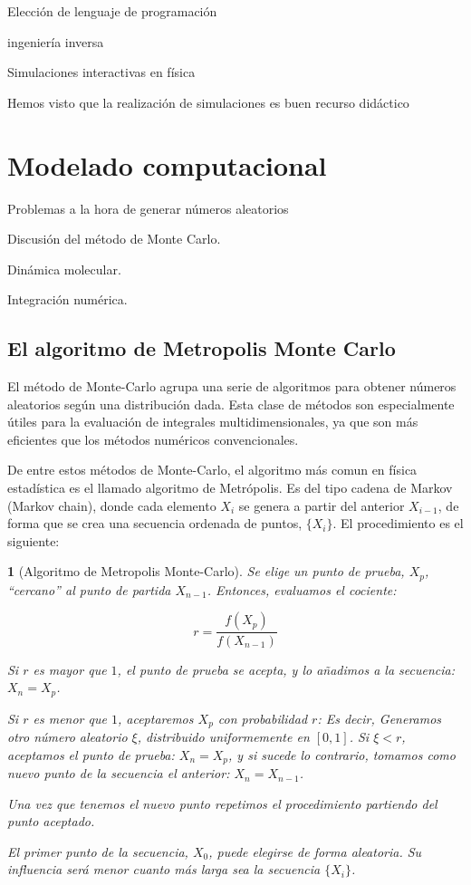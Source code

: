 \documentclass[11pt, a4paper]{article} %
\theoremstyle{named}
\newtheorem*{namedtheorem}{}
\begin{document}
Elección de lenguaje de programación

ingeniería inversa

Simulaciones interactivas en física

Hemos visto que la realización de simulaciones es buen recurso didáctico

\newpage
\appendix

\section{Modelado computacional}\label{sec:modComp}

Problemas a la hora de generar números aleatorios

Discusión del método de Monte Carlo.

Dinámica molecular.

Integración numérica.

\subsection{El algoritmo de Metropolis Monte Carlo}\label{sec:metropolis}

El método de Monte-Carlo agrupa una serie de algoritmos para obtener números aleatorios según una distribución dada. Esta clase de métodos son especialmente útiles para la evaluación de integrales multidimensionales, ya que son más eficientes que los métodos numéricos convencionales.

De entre estos métodos de Monte-Carlo, el algoritmo más comun en física estadística es el llamado algoritmo de Metrópolis. Es del tipo cadena de Markov (Markov chain), donde cada elemento $X_i$ se genera a partir del anterior $X_{i-1}$, de forma que se crea una secuencia ordenada de puntos, $\{X_i\}$. El procedimiento es el siguiente:

\begin{namedtheorem}[Algoritmo de Metropolis Monte-Carlo]
Se elige un punto de prueba, $X_{p}$, ``cercano'' al punto de partida $X_{n-1}$. Entonces, evaluamos el cociente:

\begin{equation}\label{eq:metropCoci}
r= \frac{f(X_p)}{f(X_{n-1})}
\end{equation}

Si $r$ es mayor que $1$, el punto de prueba se acepta, y lo añadimos a la secuencia: $X_{n} = X_p$.

Si $r$ es menor que $1$, aceptaremos $X_p$ con probabilidad $r$: Es decir, Generamos otro número aleatorio $\xi$, distribuido uniformemente en $[0,1]$. Si $\xi < r$, aceptamos el punto de prueba: $X_{n} = X_p$, y si sucede lo contrario, tomamos como nuevo punto de la secuencia el anterior: $X_{n} = X_{n-1}$.

Una vez que tenemos el nuevo punto repetimos el procedimiento partiendo del punto aceptado.

El primer punto de la secuencia, $X_0$, puede elegirse de forma aleatoria. Su influencia será menor cuanto más larga sea la secuencia $\{X_i\}$.
\end{namedtheorem}
\end{document}
